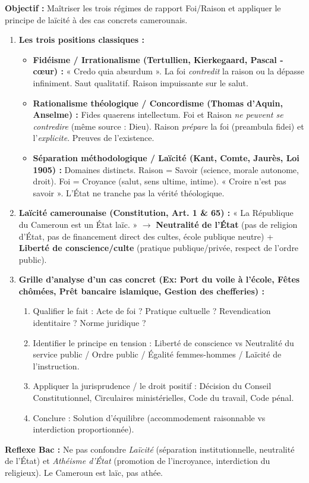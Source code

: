 \documentclass[11pt]{article}
\newcommand{\cle}[1]{{\popxbold\color{popdark}#1}}
\begin{document}
\begin{methode}
\textbf{Objectif :} Maîtriser les trois régimes de rapport Foi/Raison et appliquer le principe de laïcité à des cas concrets camerounais.
\begin{enumerate}
    \item \textbf{Les trois positions classiques :}
    \begin{itemize}
        \item \textbf{Fidéisme / Irrationalisme (Tertullien, Kierkegaard, Pascal - cœur) :} « Credo quia absurdum ». La foi \emph{contredit} la raison ou la dépasse infiniment. \cle{Saut qualitatif}. Raison impuissante sur le salut.
        \item \textbf{Rationalisme théologique / Concordisme (Thomas d'Aquin, Anselme) :} \cle{Fides quaerens intellectum}. Foi et Raison \emph{ne peuvent se contredire} (même source : Dieu). Raison \emph{prépare} la foi (preambula fidei) et l'\emph{explicite}. Preuves de l'existence.
        \item \textbf{Séparation méthodologique / Laïcité (Kant, Comte, Jaurès, Loi 1905) :} \cle{Domaines distincts}. Raison = Savoir (science, morale autonome, droit). Foi = Croyance (salut, sens ultime, intime). « Croire n'est pas savoir ». L'État ne tranche pas la vérité théologique.
    \end{itemize}
    \item \textbf{Laïcité camerounaise (Constitution, Art. 1 \& 65) :} « La République du Cameroun est un État laïc. » $\rightarrow$ \textbf{Neutralité de l'État} (pas de religion d'État, pas de financement direct des cultes, école publique neutre) + \textbf{Liberté de conscience/culte} (pratique publique/privée, respect de l'ordre public).
    \item \textbf{Grille d'analyse d'un cas concret (Ex: Port du voile à l'école, Fêtes chômées, Prêt bancaire islamique, Gestion des chefferies) :}
    \begin{enumerate}
        \item Qualifier le fait : Acte de foi ? Pratique cultuelle ? Revendication identitaire ? Norme juridique ?
        \item Identifier le principe en tension : Liberté de conscience vs Neutralité du service public / Ordre public / Égalité femmes-hommes / Laïcité de l'instruction.
        \item Appliquer la jurisprudence / le droit positif : Décision du Conseil Constitutionnel, Circulaires ministérielles, Code du travail, Code pénal.
        \item Conclure : Solution d'équilibre (accommodement raisonnable vs interdiction proportionnée).
    \end{enumerate}
\end{enumerate}
\textbf{Reflexe Bac :} Ne pas confondre \emph{Laïcité} (séparation institutionnelle, neutralité de l'État) et \emph{Athéisme d'État} (promotion de l'incroyance, interdiction du religieux). Le Cameroun est laïc, pas athée.
\end{methode}
\end{document}

